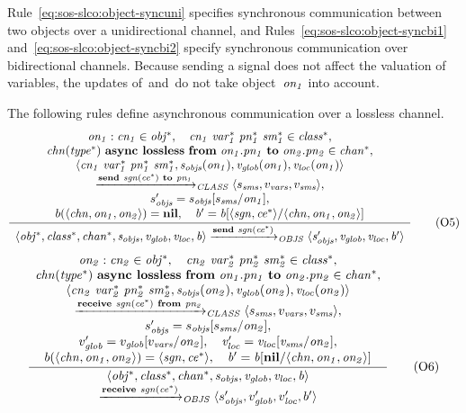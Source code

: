 \noindent
Rule~\eqref{eq:sos-slco:object-syncuni} specifies synchronous communication between two objects over a unidirectional channel, and Rules~\eqref{eq:sos-slco:object-syncbi1} and~\eqref{eq:sos-slco:object-syncbi2} specify synchronous communication over bidirectional channels.
Because sending a signal does not affect the valuation of variables, the updates of~\vglob and~\vloc do not take object~$\it{on_1}$ into account.

The following rules define asynchronous communication over a lossless channel.
%
\begin{equation*}
 \frac{ \begin{array}[c]{c} 
\it{on_1}:\it{cn_1} \in \it{obj^*}, \quad
\it{cn_1}~\it{var^*_1}~\it{pn^*_1}~\it{sm^*_1} \in \it{class^*}, \\
\it{chn}(\it{type^*})~\textbf{async lossless}~\textbf{from}~\it{on_1}.\it{pn_1}~\textbf{to}~\it{on_2}.\it{pn_2} \in \it{chan^*}, \\
\langle \it{cn_1}~\it{var^*_1}~\it{pn^*_1}~\it{sm^*_1}, s_{\it{objs}}(\it{on_1}), v_{\it{glob}}(\it{on_1}), v_{\it{loc}}(\it{on_1}) \rangle \\
\xrightarrow{\it{\textbf{send}~\it{sgn}(\it{ce^*})~\textbf{to}~\it{pn_1}}}_{\it{CLASS}}
\langle s_{\it{sms}}, v_{\it{vars}}, v_{\it{sms}} \rangle, \\
s_{\it{objs}}' = s_{\it{objs}}[s_{\it{sms}}/\it{on_1}], \\
b(\langle \it{chn}, \it{on_1}, \it{on_2} \rangle) = \textbf{nil}, \quad
b' = b[\langle \it{sgn}, \it{ce^*} \rangle/\langle \it{chn}, \it{on_1}, \it{on_2} \rangle]
 \end{array} }{ \begin{array}[c]{c} 
\langle \it{obj^*}, \it{class^*}, \it{chan^*}, s_{\it{objs}}, v_{\it{glob}}, v_{\it{loc}}, b \rangle
\xrightarrow{\it{\textbf{send}~\it{sgn}(\it{ce^*})}}_{\it{OBJS}}
\langle s_{\it{objs}}', v_{\it{glob}}, v_{\it{loc}}, b' \rangle
 \end{array} } 
\tag{O5}
\label{eq:sos-slco:object-async1}
\end{equation*}
%
\begin{equation*}
 \frac{ \begin{array}[c]{c} 
\it{on_2}:\it{cn_2} \in \it{obj^*}, \quad
\it{cn_2}~\it{var^*_2}~\it{pn^*_2}~\it{sm^*_2} \in \it{class^*}, \\
\it{chn}(\it{type^*})~\textbf{async lossless}~\textbf{from}~\it{on_1}.\it{pn_1}~\textbf{to}~\it{on_2}.\it{pn_2} \in \it{chan^*}, \\
\langle \it{cn_2}~\it{var^*_2}~\it{pn^*_2}~\it{sm^*_2}, s_{\it{objs}}(\it{on_2}), v_{\it{glob}}(\it{on_2}), v_{\it{loc}}(\it{on_2}) \rangle \\
\xrightarrow{\it{\textbf{receive}~\it{sgn}(\it{ce^*})~\textbf{from}~\it{pn_2}}}_{\it{CLASS}}
\langle s_{\it{sms}}, v_{\it{vars}}, v_{\it{sms}} \rangle, \\
s_{\it{objs}}' = s_{\it{objs}}[s_{\it{sms}}/\it{on_2}], \\
v_{\it{glob}}' = v_{\it{glob}}[v_{\it{vars}}/\it{on_2}], \quad
v_{\it{loc}}' = v_{\it{loc}}[v_{\it{sms}}/\it{on_2}], \\
b(\langle \it{chn}, \it{on_1}, \it{on_2} \rangle) = \langle \it{sgn}, \it{ce^*} \rangle, \quad
b' = b[\textbf{nil}/\langle \it{chn}, \it{on_1}, \it{on_2} \rangle]
 \end{array} }{ \begin{array}[c]{c} 
\langle \it{obj^*}, \it{class^*}, \it{chan^*}, s_{\it{objs}}, v_{\it{glob}}, v_{\it{loc}}, b \rangle \\
\xrightarrow{\it{\textbf{receive}~\it{sgn}(\it{ce^*})}}_{\it{OBJS}}
\langle s_{\it{objs}}', v_{\it{glob}}', v_{\it{loc}}', b' \rangle
 \end{array} } 
\tag{O6}
\label{eq:sos-slco:object-async2}
\end{equation*}

